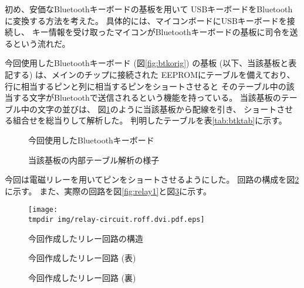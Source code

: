  \label{sc:usb2bt}
初め、安価なBluetoothキーボードの基板を用いて
USBキーボードをBluetoothに変換する方法を考えた。
具体的には、マイコンボードにUSBキーボードを接続し、
キー情報を受け取ったマイコンがBluetoothキーボードの基板に司令を送るという流れだ。

今回使用したBluetoothキーボード (図\ref{fig:btkorig}) の基板
(以下、当該基板と表記する) は、メインのチップに接続された
EEPROMにテーブルを備えており、行に相当するピンと列に相当するピンをショートさせると
そのテーブル中の該当する文字がBluetoothで送信されるという機能を持っている。
当該基板のテーブル中の文字の並びは、
図\ref{fig:btkbase}のように当該基板から配線を引き、
ショートさせる組合せを総当りして解析した。
判明したテーブルを表\ref{tab:btktab}に示す。

\begin{figure}[H]
\centering
\begin{minipage}{0.45\linewidth}
\caption{今回使用したBluetoothキーボード}
\label{fig:btkorig}
\end{minipage}
\begin{minipage}{0.45\linewidth}
\caption{当該基板の内部テーブル解析の様子}
\label{fig:btkbase}
\end{minipage}
\end{figure}



今回は電磁リレーを用いてピンをショートさせるようにした。
回路の構成を図\ref{fig:relay-circuit}に示す。
また、実際の回路を図\ref{fig:relay1}と図\ref{fig:relay2}に示す。

\begin{figure}[H]
\centering
\begin{minipage}{0.5\linewidth}
\texttt{[image: \\tmpdir img/relay-circuit.roff.dvi.pdf.eps]}
\caption{今回作成したリレー回路の構造}
\label{fig:relay-circuit}
\end{minipage}
\end{figure}

\begin{figure}[H]
\centering
\begin{minipage}{0.35\linewidth}
\caption{今回作成したリレー回路 (表)}
\label{fig:relay1}
\end{minipage}
\begin{minipage}{0.35\linewidth}
\caption{今回作成したリレー回路 (裏)}
\label{fig:relay2}
\end{minipage}
\end{figure}

